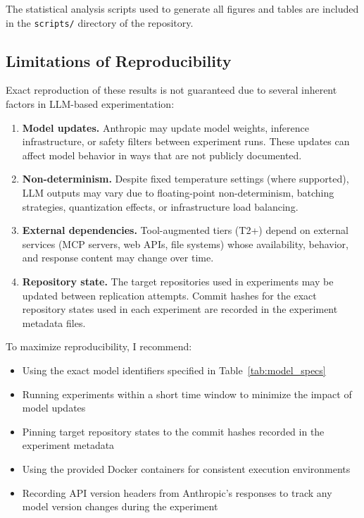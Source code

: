 \documentclass[11pt]{article}
\begin{document}
The statistical analysis scripts used to generate all figures and tables are
included in the \texttt{scripts/} directory of the repository.

\subsection{Limitations of Reproducibility}

Exact reproduction of these results is not guaranteed due to several inherent
factors in LLM-based experimentation:

\begin{enumerate}
  \item \textbf{Model updates.} Anthropic may update model weights, inference
    infrastructure, or safety filters between experiment runs. These updates
    can affect model behavior in ways that are not publicly documented.
  \item \textbf{Non-determinism.} Despite fixed temperature settings (where
    supported), LLM outputs may vary due to floating-point non-determinism,
    batching strategies, quantization effects, or infrastructure load
    balancing.
  \item \textbf{External dependencies.} Tool-augmented tiers (T2+) depend on
    external services (MCP servers, web APIs, file systems) whose availability,
    behavior, and response content may change over time.
  \item \textbf{Repository state.} The target repositories used in experiments
    may be updated between replication attempts. Commit hashes for the exact
    repository states used in each experiment are recorded in the experiment
    metadata files.
\end{enumerate}

To maximize reproducibility, I recommend:
\begin{itemize}
  \item Using the exact model identifiers specified in
    Table~\ref{tab:model_specs}
  \item Running experiments within a short time window to minimize the impact
    of model updates
  \item Pinning target repository states to the commit hashes recorded in
    the experiment metadata
  \item Using the provided Docker containers for consistent execution
    environments
  \item Recording API version headers from Anthropic's responses to track
    any model version changes during the experiment
\end{itemize}
\end{document}
